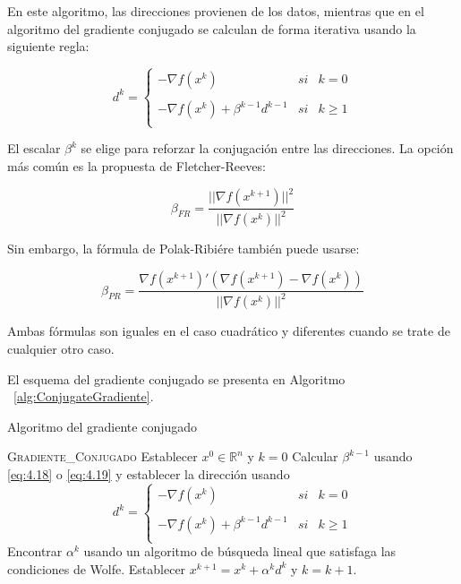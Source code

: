 En este algoritmo, las direcciones provienen de los datos, mientras que en el algoritmo del gradiente conjugado se calculan de forma iterativa usando la siguiente regla:

\begin{equation*}
d^k= \left\{ \begin{array}{lcc}
             -\nabla f(x^k) &   si  & k = 0 \\
             \\ -\nabla f(x^k)+\beta^{k-1}d^{k-1} &  si & k\geq 1 \\
             \end{array}
   \right.
\end{equation*}

El escalar $\beta^k$ se elige para reforzar la conjugación entre las direcciones. 
La opción más común es la propuesta de Fletcher-Reeves:

\begin{equation}
\beta_{FR} = \dfrac{||\nabla f(x^{k+1})||^2}{||\nabla f(x^k)||^2}
\label{eq:4.18}
\end{equation}

Sin embargo, la fórmula de Polak-Ribiére también puede usarse:

\begin{equation}
\beta_{PR} = \dfrac{\nabla f(x^{k+1})'(\nabla f(x^{k+1})-\nabla f(x^k))}{||\nabla f(x^k)||^2}
\label{eq:4.19}
\end{equation}

Ambas fórmulas son iguales en el caso cuadrático y diferentes cuando se trate de cualquier otro caso.

El esquema del gradiente conjugado se presenta en Algoritmo ~\ref{alg:ConjugateGradiente}.

\begin{algorithm}
\caption{Algoritmo del gradiente conjugado}\label{alg:ConjugateGradiente}
\begin{algorithmic}[1]
\Procedure \textsc{Gradiente\_Conjugado}
\State Establecer $x^0\in\mathbb{R}^n$ y $k=0$
	\State Calcular $\beta^{k-1}$ usando \ref{eq:4.18} o \ref{eq:4.19} y establecer la dirección usando \begin{equation*}
d^k= \left\{ \begin{array}{lcc}
             -\nabla f(x^k) &   si  & k = 0 \\
             \\ -\nabla f(x^k)+\beta^{k-1}d^{k-1} &  si & k\geq 1 \\
             \end{array}
   \right.
\end{equation*}
	\State Encontrar $\alpha^k$ usando un algoritmo de búsqueda lineal que satisfaga las condiciones de Wolfe.
	\State Establecer $x^{k+1} = x^k + \alpha^kd^k$ y $k=k+1$.
\EndWhile
\EndProcedure
\end{algorithmic}
\end{algorithm}

